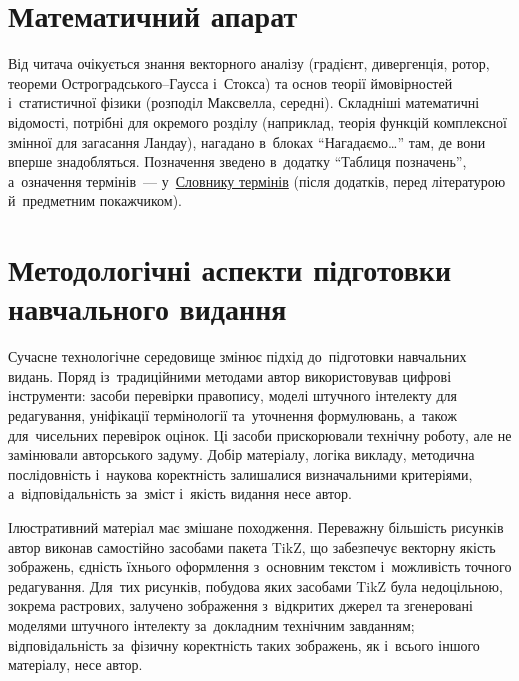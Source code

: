 \section*{Математичний апарат}

Від читача очікується знання векторного аналізу (градієнт, дивергенція, ротор, теореми Остроградського--Гаусса
і~Стокса) та основ теорії ймовірностей і~статистичної фізики (розподіл Максвелла, середні). Складніші
математичні відомості, потрібні для окремого розділу (наприклад, теорія функцій комплексної змінної для
загасання Ландау), нагадано в~блоках \enquote{Нагадаємо\dots} там, де вони вперше знадобляться. Позначення
зведено в~додатку \enquote{Таблиця позначень}, а~означення термінів~--- у~\hyperref[sec:glossary]{Словнику термінів}
(після додатків, перед літературою й~предметним покажчиком).

\section*{Методологічні аспекти підготовки навчального видання}

Сучасне технологічне середовище змінює підхід до~підготовки навчальних видань. Поряд із~традиційними
методами автор використовував цифрові інструменти: засоби перевірки правопису, моделі штучного інтелекту
для редагування, уніфікації термінології та~уточнення формулювань, а~також для~чисельних перевірок оцінок.
Ці засоби прискорювали технічну роботу, але не замінювали авторського задуму. Добір матеріалу, логіка
викладу, методична послідовність і~наукова коректність залишалися визначальними критеріями, а~відповідальність
за~зміст і~якість видання несе автор.

Ілюстративний матеріал має змішане походження. Переважну більшість рисунків автор виконав самостійно
засобами пакета TikZ, що забезпечує векторну якість зображень, єдність їхнього оформлення з~основним текстом
і~можливість точного редагування. Для~тих рисунків, побудова яких засобами TikZ була недоцільною, зокрема
растрових, залучено зображення з~відкритих джерел та згенеровані моделями штучного інтелекту за~докладним
технічним завданням; відповідальність за~фізичну коректність таких зображень, як і~всього іншого матеріалу,
несе автор.

